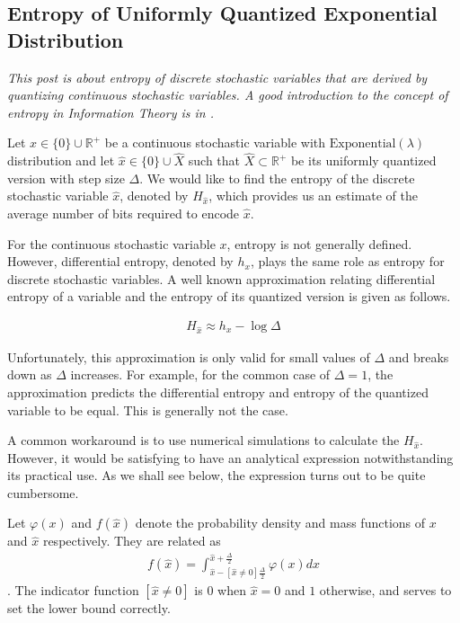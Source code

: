\subsection{Entropy of Uniformly Quantized Exponential Distribution}
\label{sec:003_entropy}

\emph{This post is about entropy of discrete stochastic variables that are derived by quantizing continuous stochastic variables. A good introduction to the concept of entropy in Information Theory is in \cite{Cover2012}.}

Let $x \in \{0\} \cup \mathbb{R}^+ $ be a continuous stochastic variable with $\text{Exponential}(\lambda)$ distribution and let $\hat{x} \in \{0\} \cup \hat{X}$ such that $\hat{X} \subset \mathbb{R}^+$ be its uniformly quantized version with step size $\Delta$. We would like to find the entropy of the discrete stochastic variable $\hat{x}$, denoted by $H_{\hat{x}}$, which provides us an estimate of the average number of bits required to encode $\hat{x}$.

For the continuous stochastic variable $x$, entropy is not generally defined. However, differential entropy, denoted by $h_x$, plays the same role as entropy for discrete stochastic variables. A well known approximation relating differential entropy of a variable and the entropy of its quantized version is given as follows.

\begin{align} H_{\hat{x}} \approx h_x - \log \Delta \end{align}

Unfortunately, this approximation is only valid for small values of $\Delta$ and breaks down as $\Delta$ increases. For example, for the common case of $\Delta = 1$, the approximation predicts the differential entropy and entropy of the quantized variable to be equal. This is generally not the case.

A common workaround is to use numerical simulations to calculate the $H_{\hat{x}}$. However, it would be satisfying to have an analytical expression notwithstanding its practical use. As we shall see below, the expression turns out to be quite cumbersome.

Let $\varphi(x)$ and $f(\hat{x})$ denote the probability density and mass functions of $x$ and $\hat{x}$ respectively. They are related as 
\begin{align}f(\hat{x}) = \int_{\hat{x} - [\hat{x} \neq 0]\frac{\Delta}{2}}^{\hat{x} + \frac{\Delta}{2}} \varphi(x) dx\end{align}. 
The indicator function $[\hat{x} \neq 0]$ is $0$ when $\hat{x} = 0$ and $1$ otherwise, and serves to set the lower bound correctly.

